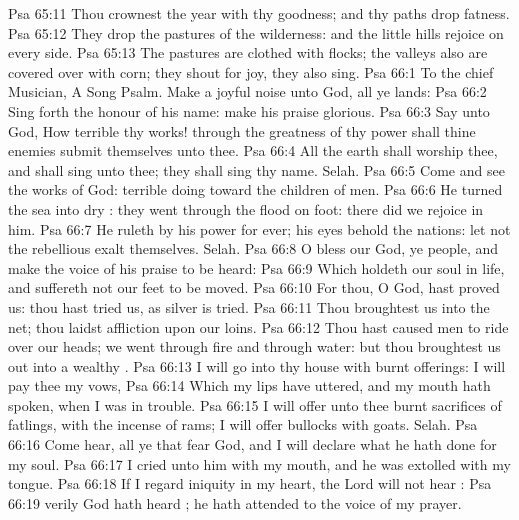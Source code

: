 \vs Psa 65:11 Thou crownest the year with thy goodness; and thy paths drop fatness.
\vs Psa 65:12 They drop  the pastures of the wilderness: and the little hills rejoice on every side.
\vs Psa 65:13 The pastures are clothed with flocks; the valleys also are covered over with corn; they shout for joy, they also sing.
\vs Psa 66:1 To the chief Musician, A Song  Psalm. Make a joyful noise unto God, all ye lands:
\vs Psa 66:2 Sing forth the honour of his name: make his praise glorious.
\vs Psa 66:3 Say unto God, How terrible  thy works! through the greatness of thy power shall thine enemies submit themselves unto thee.
\vs Psa 66:4 All the earth shall worship thee, and shall sing unto thee; they shall sing  thy name. Selah.
\vs Psa 66:5 Come and see the works of God:  terrible  doing toward the children of men.
\vs Psa 66:6 He turned the sea into dry : they went through the flood on foot: there did we rejoice in him.
\vs Psa 66:7 He ruleth by his power for ever; his eyes behold the nations: let not the rebellious exalt themselves. Selah.
\vs Psa 66:8 O bless our God, ye people, and make the voice of his praise to be heard:
\vs Psa 66:9 Which holdeth our soul in life, and suffereth not our feet to be moved.
\vs Psa 66:10 For thou, O God, hast proved us: thou hast tried us, as silver is tried.
\vs Psa 66:11 Thou broughtest us into the net; thou laidst affliction upon our loins.
\vs Psa 66:12 Thou hast caused men to ride over our heads; we went through fire and through water: but thou broughtest us out into a wealthy .
\vs Psa 66:13 I will go into thy house with burnt offerings: I will pay thee my vows,
\vs Psa 66:14 Which my lips have uttered, and my mouth hath spoken, when I was in trouble.
\vs Psa 66:15 I will offer unto thee burnt sacrifices of fatlings, with the incense of rams; I will offer bullocks with goats. Selah.
\vs Psa 66:16 Come  hear, all ye that fear God, and I will declare what he hath done for my soul.
\vs Psa 66:17 I cried unto him with my mouth, and he was extolled with my tongue.
\vs Psa 66:18 If I regard iniquity in my heart, the Lord will not hear :
\vs Psa 66:19  verily God hath heard ; he hath attended to the voice of my prayer.
